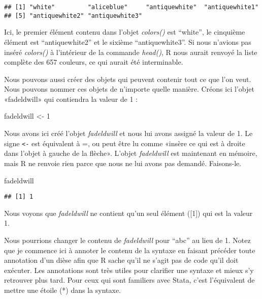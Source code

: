 \documentclass[
]{book}
\newenvironment{Shaded}{\begin{snugshade}}{\end{snugshade}}
\newcommand{\DecValTok}[1]{\textcolor[rgb]{0.00,0.00,0.81}{#1}}
\newcommand{\NormalTok}[1]{#1}
\newcommand{\OtherTok}[1]{\textcolor[rgb]{0.56,0.35,0.01}{#1}}
\begin{document}
\begin{verbatim}
## [1] "white"         "aliceblue"     "antiquewhite"  "antiquewhite1"
## [5] "antiquewhite2" "antiquewhite3"
\end{verbatim}

Ici, le premier élément contenu dans l'objet \emph{colors()} est ``white'', le cinquième élément est ``antiquewhite2'' et le sixième ``antiquewhite3''. Si nous n'avions pas inséré \emph{colors()} à l'intérieur de la commande \emph{head()}, R nous aurait renvoyé la liste complète des 657 couleurs, ce qui aurait été interminable.

Nous pouvons aussi créer des objets qui peuvent contenir tout ce que l'on veut. Nous pouvons nommer ces objets de n'importe quelle manière. Créons ici l'objet «fadeldwill» qui contiendra la valeur de 1 :

\begin{Shaded}
\begin{Highlighting}[]
\NormalTok{fadeldwill }\OtherTok{\textless{}{-}} \DecValTok{1}
\end{Highlighting}
\end{Shaded}

Nous avons ici créé l'objet \emph{fadeldwill} et nous lui avons assigné la valeur de 1. Le signe \texttt{\textless{}-} est équivalent à =, ou peut être lu comme «insère ce qui est à droite dans l'objet à gauche de la flèche». L'objet \emph{fadeldwill} est maintenant en mémoire, mais R ne renvoie rien parce que nous ne lui avons pas demandé. Faisons-le.

\begin{Shaded}
\begin{Highlighting}[]
\NormalTok{fadeldwill}
\end{Highlighting}
\end{Shaded}

\begin{verbatim}
## [1] 1
\end{verbatim}

Nous voyons que \emph{fadeldwill} ne contient qu'un seul élément ({[}1{]}) qui est la valeur 1.

Nous pourrions changer le contenu de \emph{fadeldwill} pour ``abc'' au lieu de 1. Notez que je commence ici à annoter le contenu de la syntaxe en faisant précéder toute annotation d'un dièse afin que R sache qu'il ne s'agit pas de code qu'il doit exécuter. Les annotations sont très utiles pour clarifier une syntaxe et mieux s'y retrouver plus tard. Pour ceux qui sont familiers avec Stata, c'est l'équivalent de mettre une étoile (*) dans la syntaxe.
\end{document}
